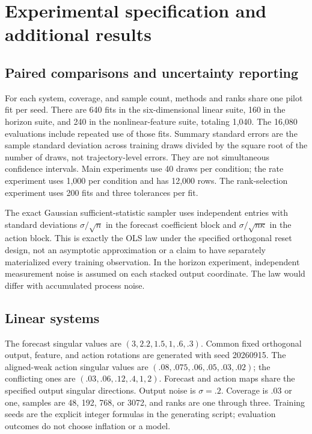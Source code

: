 \section{Experimental specification and additional results}
\subsection{Paired comparisons and uncertainty reporting}
For each system, coverage, and sample count, methods and ranks share one pilot fit per seed. There are 640 fits in the six-dimensional linear suite, 160 in the horizon suite, and 240 in the nonlinear-feature suite, totaling 1,040. The 16,080 evaluations include repeated use of those fits. Summary standard errors are the sample standard deviation across training draws divided by the square root of the number of draws, not trajectory-level errors. They are not simultaneous confidence intervals. Main experiments use 40 draws per condition; the rate experiment uses 1,000 per condition and has 12,000 rows. The rank-selection experiment uses 200 fits and three tolerances per fit.

The exact Gaussian sufficient-statistic sampler uses independent entries with standard deviations $\sigma/\sqrt n$ in the forecast coefficient block and $\sigma/\sqrt{n\kappa}$ in the action block. This is exactly the OLS law under the specified orthogonal reset design, not an asymptotic approximation or a claim to have separately materialized every training observation. In the horizon experiment, independent measurement noise is assumed on each stacked output coordinate. The law would differ with accumulated process noise.

\subsection{Linear systems}
The forecast singular values are $(3,2.2,1.5,1,.6,.3)$. Common fixed orthogonal output, feature, and action rotations are generated with seed 20260915. The aligned-weak action singular values are $(.08,.075,.06,.05,.03,.02)$; the conflicting ones are $(.03,.06,.12,.4,1,2)$. Forecast and action maps share the specified output singular directions. Output noise is $\sigma=.2$. Coverage is $.03$ or one, samples are 48, 192, 768, or 3072, and ranks are one through three. Training seeds are the explicit integer formulas in the generating script; evaluation outcomes do not choose inflation or a model.

